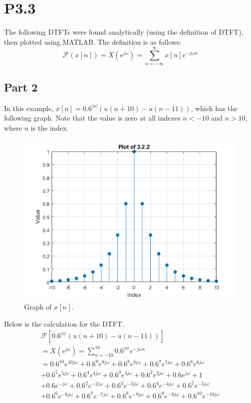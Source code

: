 \documentclass{article}
\begin{document}
\section*{P3.3}
The following DTFTs were found analytically (using the definition of DTFT), then plotted using MATLAB. The definition is as follows:
\begin{equation}
    \mathcal{F}(x[n]) = X\left(e^{j\omega}\right) = \sum_{n = -\infty}^\infty x[n] e^{-j\omega n}
\end{equation}
\subsection*{Part 2}
In this example, \(x[n] = 0.6^{|n|}( u(n+10) - u(n - 11) )\), which has the following graph. Note that the value is zero at all indexes \(n < -10\) and \(n > 10\), where \(n\) is the index.
\begin{figure}[H]
    \centering
    \includegraphics[width=\textwidth]{Images/Problem-3-2-2.png}
    \caption{Graph of \(x[n]\).}
    \label{plot 3.2.2}
\end{figure}

Below is the calculation for the DTFT.
\begin{gather*}
    \mathcal{F}[0.6^{|n|}( u(n+10) - u(n - 11) )] \\
    = X\left(e^{j\omega}\right) = 
    \sum_{n = -10}^{10} 0.6^{|n|}e^{-j\omega n}\\
    = 0.6^{10}e^{10j\omega} + 0.6^{9}e^{9j\omega} + 0.6^{8}e^{8j\omega} + 0.6^{7}e^{7j\omega} + 0.6^{6}e^{6j\omega}\\ + 0.6^{5}e^{5j\omega} + 0.6^{4}e^{4j\omega} + 0.6^{3}e^{3j\omega} + 0.6^{2}e^{2j\omega} + 0.6e^{j\omega} + 1\\
    + 0.6e^{-j\omega} + 0.6^2e^{-2j\omega} + 0.6^3e^{-3j\omega} + 0.6^4e^{-4j\omega} + 0.6^5e^{-5j\omega}\\ + 0.6^6e^{-6j\omega} + 0.6^7e^{-7j\omega} + 0.6^8e^{-8j\omega} + 0.6^9e^{-9j\omega} + 0.6^{10}e^{-10j\omega}
\end{gather*}
\end{document}
